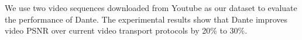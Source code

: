 We use two video sequences downloaded from Youtube as our dataset to evaluate the performance of Dante. The experimental results show that Dante improves video PSNR over current video transport protocols by 20\% to 30\%.

